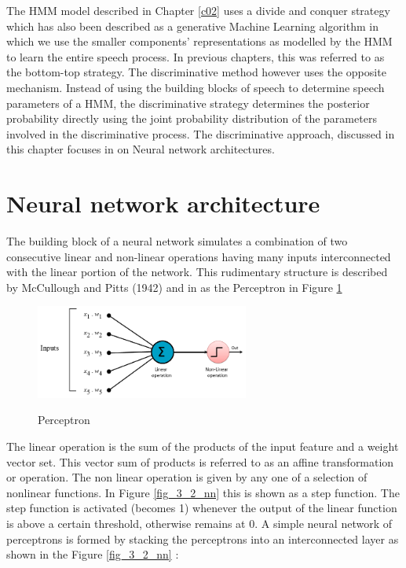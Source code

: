 The HMM model described in Chapter \ref{c02} uses a divide and conquer strategy which has also been described as a generative Machine Learning algorithm in which we use the smaller components’ representations as modelled by the HMM to learn the entire speech process.   In previous chapters, this was referred to as the bottom-top strategy.  The discriminative method however uses the opposite mechanism.  Instead of using the building blocks of speech to determine speech parameters of a HMM, the discriminative strategy determines the posterior probability directly using the joint probability distribution of the parameters involved in the discriminative process.  The discriminative approach, discussed in this chapter focuses in on Neural network architectures.

\section{Neural network architecture}

The building block of a neural network simulates a combination of two consecutive linear and non-linear operations having many inputs interconnected with the linear portion of the network.  This rudimentary structure is described by McCullough and Pitts (1942) and in  \cite{cowan1990discussion} as the Perceptron in Figure \ref{fig_3_1_ptron} 

\begin{figure}
\centering
  \includegraphics[width=7cm]{thesis/images/ptron2.png}\\
  \caption{Perceptron} \label{fig_3_1_ptron}
\end{figure}

The linear operation is the sum of the products of the input feature and a  weight vector set.  This vector sum of products is referred to as an affine transformation or operation.  The non linear operation is given by any one of a selection of nonlinear functions.  In  Figure \ref{fig_3_2_nn} this is shown as a step function.  The step function is activated (becomes 1) whenever the output of the linear function is above a certain threshold, otherwise remains at 0.  A simple neural network of perceptrons is formed by stacking the perceptrons into an interconnected layer as shown in the Figure \ref{fig_3_2_nn}  :

